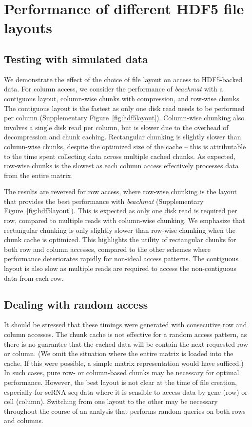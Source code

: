 \documentclass{article}
\newcommand{\beachmat}{\textit{beachmat}}
\begin{document}
\section{Performance of different HDF5 file layouts}

\subsection{Testing with simulated data}
We demonstrate the effect of the choice of file layout on access to HDF5-backed data.
For column access, we consider the performance of \beachmat{} with a contiguous layout, column-wise chunks with compression, and row-wise chunks.
The contiguous layout is the fastest as only one disk read needs to be performed per column (Supplementary Figure~\ref{fig:hdf5layout}).
Column-wise chunking also involves a single disk read per column, but is slower due to the overhead of decompression and chunk caching.
Rectangular chunking is slightly slower than column-wise chunks, despite the optimized size of the cache -- this is attributable to the time spent collecting data across multiple cached chunks.
As expected, row-wise chunks is the slowest as each column access effectively processes data from the entire matrix.

The results are reversed for row access, where row-wise chunking is the layout that provides the best performance with \beachmat{} (Supplementary Figure~\ref{fig:hdf5layout}).
This is expected as only one disk read is required per row, compared to multiple reads with column-wise chunking.
We emphasize that rectangular chunking is only slightly slower than row-wise chunking when the chunk cache is optimized.
This highlights the utility of rectangular chunks for both row and column accesses, compared to the other schemes where performance deteriorates rapidly for non-ideal access patterns.
The contiguous layout is also slow as multiple reads are required to access the non-contiguous data from each row.

\subsection{Dealing with random access}
It should be stressed that these timings were generated with consecutive row and column accesses.
The chunk cache is not effective for a random access pattern, as there is no guarantee that the cached data will be contain the next requested row or column.
(We omit the situation where the entire matrix is loaded into the cache.
If this were possible, a simple matrix representation would have sufficed.)
In such cases, pure row- or column-based chunks may be necessary for optimal performance.
However, the best layout is not clear at the time of file creation, especially for scRNA-seq data where it is sensible to access data by gene (row) or cell (column).
Switching from one layout to the other may be necessary throughout the course of an analysis that performs random queries on both rows and columns.
\end{document}
